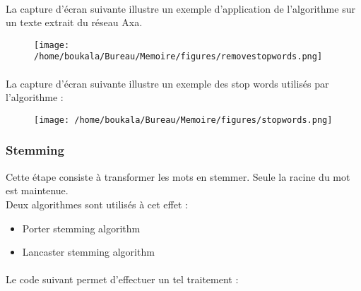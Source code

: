 \documentclass[12pt, a4paper, oneside]{book}
\begin{document}
\paragraph{}
La capture d'écran suivante illustre un exemple d'application de l'algorithme sur un texte extrait du réseau Axa.


\begin{figure}[h!]
\begin{center}
\texttt{[image: /home/boukala/Bureau/Memoire/figures/removestopwords.png]}
\end{center}
\end{figure}



\paragraph{}
La capture d'écran suivante illustre un exemple des stop words utilisés par l'algorithme :



\begin{figure}[h!]
\begin{center}
\texttt{[image: /home/boukala/Bureau/Memoire/figures/stopwords.png]}
\end{center}
\end{figure}






\subsubsection{Stemming}

Cette étape consiste à transformer les mots en stemmer.
Seule la racine du mot est maintenue.\\
Deux algorithmes sont utilisés à cet effet :\\ 
\begin{itemize}
\item Porter stemming algorithm 
\item Lancaster stemming algorithm

\end{itemize}

\paragraph{}
Le code suivant permet d'effectuer un tel traitement : 
\end{document}
